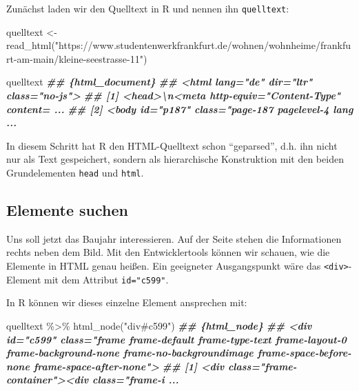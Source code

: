\documentclass[
  ngerman,
]{article}
\newenvironment{Shaded}{\begin{snugshade}}{\end{snugshade}}
\newcommand{\DocumentationTok}[1]{\textcolor[rgb]{0.56,0.35,0.01}{\textbf{\textit{#1}}}}
\newcommand{\FunctionTok}[1]{\textcolor[rgb]{0.00,0.00,0.00}{#1}}
\newcommand{\NormalTok}[1]{#1}
\newcommand{\OtherTok}[1]{\textcolor[rgb]{0.56,0.35,0.01}{#1}}
\newcommand{\SpecialCharTok}[1]{\textcolor[rgb]{0.00,0.00,0.00}{#1}}
\newcommand{\StringTok}[1]{\textcolor[rgb]{0.31,0.60,0.02}{#1}}
\begin{document}
Zunächst laden wir den Quelltext in R und nennen ihn \texttt{quelltext}:

\begin{Shaded}
\begin{Highlighting}[]
\NormalTok{quelltext }\OtherTok{\textless{}{-}} \FunctionTok{read\_html}\NormalTok{(}\StringTok{"https://www.studentenwerkfrankfurt.de/wohnen/wohnheime/frankfurt{-}am{-}main/kleine{-}seestrasse{-}11"}\NormalTok{)}

\NormalTok{quelltext}
\DocumentationTok{\#\# \{html\_document\}}
\DocumentationTok{\#\# \textless{}html lang="de" dir="ltr" class="no{-}js"\textgreater{}}
\DocumentationTok{\#\# [1] \textless{}head\textgreater{}\textbackslash{}n\textless{}meta http{-}equiv="Content{-}Type" content= ...}
\DocumentationTok{\#\# [2] \textless{}body id="p187" class="page{-}187 pagelevel{-}4 lang ...}
\end{Highlighting}
\end{Shaded}

In diesem Schritt hat R den HTML-Quelltext schon ``geparsed'', d.h. ihn nicht nur als Text gespeichert, sondern als hierarchische Konstruktion mit den beiden Grundelementen \texttt{head} und \texttt{html}.

\hypertarget{elemente-suchen}{%
\subsection{Elemente suchen}\label{elemente-suchen}}

Uns soll jetzt das Baujahr interessieren. Auf der Seite stehen die Informationen rechts neben dem Bild. Mit den Entwicklertools können wir schauen, wie die Elemente in HTML genau heißen. Ein geeigneter Ausgangspunkt wäre das \texttt{\textless{}div\textgreater{}}-Element mit dem Attribut \texttt{id="c599"}.

In R können wir dieses einzelne Element ansprechen mit:

\begin{Shaded}
\begin{Highlighting}[]
\NormalTok{quelltext }\SpecialCharTok{\%\textgreater{}\%}
  \FunctionTok{html\_node}\NormalTok{(}\StringTok{"div\#c599"}\NormalTok{)}
\DocumentationTok{\#\# \{html\_node\}}
\DocumentationTok{\#\# \textless{}div id="c599" class="frame frame{-}default frame{-}type{-}text frame{-}layout{-}0 frame{-}background{-}none frame{-}no{-}backgroundimage frame{-}space{-}before{-}none frame{-}space{-}after{-}none"\textgreater{}}
\DocumentationTok{\#\# [1] \textless{}div class="frame{-}container"\textgreater{}\textless{}div class="frame{-}i ...}
\end{Highlighting}
\end{Shaded}
\end{document}
